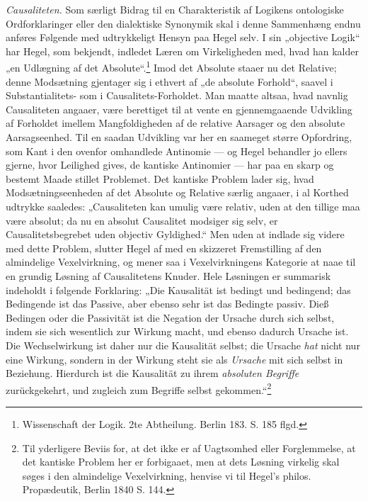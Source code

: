\documentclass[11pt]{book}
\newcommand{\opage}[1]{\marginnote{\footnotesize\textit{[#1]}}}
\begin{document}
\emph{Causaliteten.} Som særligt Bidrag til en Charakteristik af Logikens
ontologiske Ordforklaringer eller den dialektiske Synonymik skal i denne
Sammenhæng endnu anføres Følgende med udtrykkeligt Hensyn paa Hegel selv.
I sin „objective Logik“ har Hegel, som bekjendt, indledet Læren om
Virkeligheden med, hvad han kalder „en Udlægning af det
Absolute“.\footnote{Wissenschaft der Logik. 2te Abtheilung. Berlin 183. S.
185 flgd.}
Imod det Absolute staaer nu det Relative; denne Modsætning gjentager sig
i ethvert af „de absolute Forhold“, saavel i Substantialitets- som i
Causalitets-Forholdet. Man maatte altsaa, hvad navnlig Causaliteten
angaaer, være berettiget til at vente en gjennemgaaende Udvikling af
Forholdet imellem Mangfoldigheden af de relative Aarsager og den absolute
\opage{138} \setcounter{footnote}{0}%
Aarsagseenhed. Til en saadan Udvikling var her en saameget større
Opfordring, som Kant i den ovenfor omhandlede Antinomie --- og Hegel
behandler jo ellers gjerne, hvor Leilighed gives, de kantiske Antinomier
--- har paa en skarp og bestemt Maade stillet Problemet. Det kantiske
Problem lader sig, hvad Modsætningseenheden af det Absolute og Relative
særlig angaaer, i al Korthed udtrykke saaledes: „Causaliteten kan umulig
være relativ, uden at den tillige maa være absolut; da nu en absolut
Causalitet modsiger sig selv, er Causalitetsbegrebet uden objectiv
Gyldighed.“ Men uden at indlade sig videre med dette Problem, slutter
Hegel af med en skizzeret Fremstilling af den almindelige Vexelvirkning,
og mener saa i Vexelvirkningens Kategorie at naae til en grundig Løsning
af Causalitetens Knuder. Hele Løsningen er summarisk indeholdt i følgende
Forklaring: „Die Kausalität ist bedingt und bedingend; das Bedingende ist
das Passive, aber ebenso sehr ist das Bedingte passiv. Dieß Bedingen oder
die Passivität ist die Negation der Ursache durch sich selbst, indem sie
sich wesentlich zur Wirkung macht, und ebenso dadurch Ursache ist. Die
Wechselwirkung ist daher nur die Kausalität selbst; die Ursache
\emph{hat} nicht nur eine Wirkung, sondern in der Wirkung steht sie als
\emph{Ursache} mit sich selbst in Beziehung. Hierdurch ist die Kausalität
zu ihrem \emph{absoluten Begriffe} zurückgekehrt, und zugleich zum
Begriffe selbst gekommen.“\footnote{Til yderligere Beviis for, at det ikke
er af Uagtsomhed eller Forglemmelse, at det kantiske Problem her er
forbigaaet, men at dets Løsning virkelig skal søges i den almindelige
Vexelvirkning, henvise vi til Hegel's philos. Propædeutik, Berlin 1840 S.
144.}%
\end{document}
